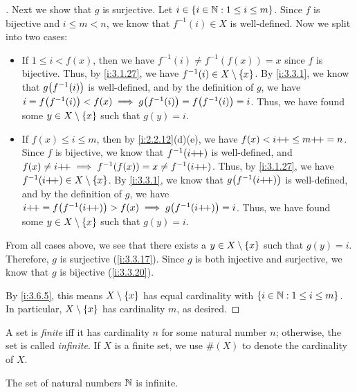 \begin{proof}[]
  Next we show that \(g\) is surjective.
  Let \(i \in \left\lbrace i \in \mathbb{N} : 1 \leq i \leq m\right\rbrace\).
  Since \(f\) is bijective and \(i \leq m < n\), we know that \(f^{-1}(i) \in X\) is well-defined.
  Now we split into two cases:
  \begin{itemize}
    \item If \(1 \leq i < f(x)\), then we have \(f^{-1}(i) \neq f^{-1}(f(x)) = x\) since \(f\) is bijective.
          Thus, by \cref{i:3.1.27}, we have \(f^{-1}(i) \in X \setminus \left\lbrace x\right\rbrace\).
          By \cref{i:3.3.1}, we know that \(g\pa{f^{-1}(i)}\) is well-defined, and by the definition of \(g\), we have \(i = f\pa{f^{-1}(i)} < f(x) \implies g\pa{f^{-1}(i)} = f\pa{f^{-1}(i)} = i\).
          Thus, we have found some \(y \in X \setminus \left\lbrace x\right\rbrace\) such that \(g(y) = i\).
    \item If \(f(x) \leq i \leq m\), then by \cref{i:2.2.12}(d)(e), we have \(f(x) < i{+}\!{+} \leq m{+}\!{+} = n\).
          Since \(f\) is bijective, we know that \(f^{-1}(i{+}\!{+})\) is well-defined, and \(f(x) \neq i{+}\!{+} \implies f^{-1}(f(x)) = x \neq f^{-1}(i{+}\!{+})\).
          Thus, by \cref{i:3.1.27}, we have \(f^{-1}(i{+}\!{+}) \in X \setminus \left\lbrace x\right\rbrace\).
          By \cref{i:3.3.1}, we know that \(g\pa{f^{-1}(i\pp)}\) is well-defined, and by the definition of \(g\), we have \(i\pp = f\pa{f^{-1}(i\pp)} > f(x) \implies g\pa{f^{-1}(i\pp)} = i\).
          Thus, we have found some \(y \in X \setminus \left\lbrace x\right\rbrace\) such that \(g(y) = i\).
  \end{itemize}
  From all cases above, we see that there exists a \(y \in X \setminus \left\lbrace x\right\rbrace\) such that \(g(y) = i\).
  Therefore, \(g\) is surjective (\cref{i:3.3.17}).
  Since \(g\) is both injective and surjective, we know that \(g\) is bijective (\cref{i:3.3.20}).

  By \cref{i:3.6.5}, this means \(X \setminus \left\lbrace x\right\rbrace\) has equal cardinality with \(\left\lbrace i \in \mathbb{N} : 1 \leq i \leq m\right\rbrace\).
  In particular, \(X \setminus \left\lbrace x\right\rbrace\) has cardinality \(m\), as desired.
\end{proof}

\begin{defn}\label{i:3.6.10}
  A set is \emph{finite} iff it has cardinality \(n\) for some natural number \(n\);
  otherwise, the set is called \emph{infinite}.
  If \(X\) is a finite set, we use \(\#(X)\) to denote the cardinality of \(X\).
\end{defn}

\setcounter{thm}{11}
\begin{thm}\label{i:3.6.12}
  The set of natural numbers \(\mathbb{N}\) is infinite.
\end{thm}


